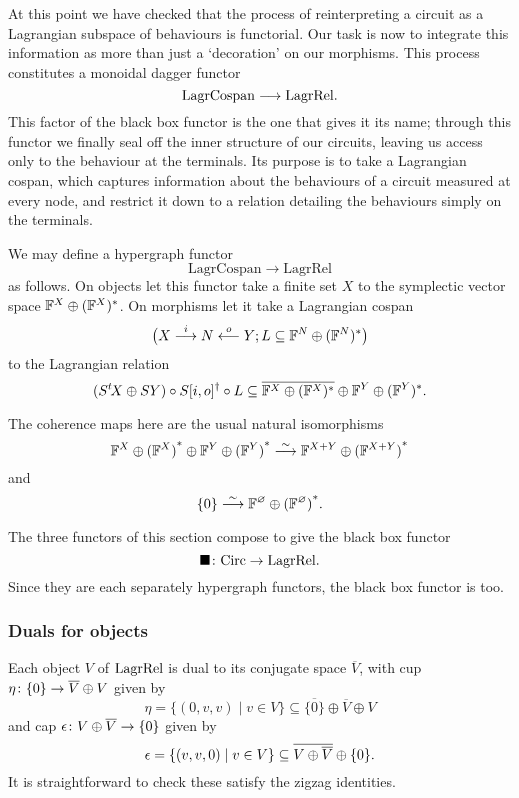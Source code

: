 At this point we have checked that the process of reinterpreting a circuit as a
Lagrangian subspace of behaviours is functorial. Our task is now to integrate
this information as more than just a `decoration' on our morphisms. This process
constitutes a monoidal dagger functor
\[
  \mathrm{LagrCospan} \longrightarrow \mathrm{LagrRel}.
\]
This factor of the black box functor is the one that gives it its name;
through this functor we finally seal off the inner structure of our circuits,
leaving us access only to the behaviour at the terminals. Its purpose is to take a 
Lagrangian cospan, which captures information about the behaviours of a 
circuit measured at every node, and restrict it down to a 
relation detailing the behaviours simply on the terminals. 

\begin{proposition}
We may define a hypergraph functor
\[
  \mathrm{LagrCospan} \longrightarrow \mathrm{LagrRel}
\]
as follows. On objects let this functor take a finite set $X$ to the symplectic
vector space ${\mathbb F}^X \oplus ({\mathbb F}^X)^\ast$. On morphisms let it take a Lagrangian
cospan
\[
  \big(X\stackrel{i}{\longrightarrow} N \stackrel{o}{\longleftarrow} Y; L
  \subseteq {\mathbb F}^N \oplus ({\mathbb F}^N)^\ast\big)
\]
to the Lagrangian relation
\[
  (S^t\!X\oplus SY) \circ S[i,o]^\dagger \circ L \subseteq
  \overline{{\mathbb F}^X \oplus ({\mathbb F}^X)^\ast} \oplus {\mathbb F}^Y \oplus ({\mathbb F}^Y)^\ast.  
\]  
\end{proposition}

The coherence maps here are the usual natural isomorphisms
\[
  {{\mathbb F}^{X} \oplus {({\mathbb F}^{X})}^\ast} \oplus {{\mathbb F}^{Y} \oplus {({\mathbb F}^{Y})}^\ast} \stackrel{\sim}{\longrightarrow} {{\mathbb F}^{X+Y} \oplus {({\mathbb F}^{X+Y})}^\ast} 
\]
and
\[
  \{0\} \stackrel{\sim}{\longrightarrow} {{\mathbb F}^{\varnothing} \oplus {({\mathbb F}^{\varnothing})}^\ast}.
\]

The three functors of this section compose to give the black box functor
\[
\blacksquare{\colon} \mathrm{Circ} \to \mathrm{LagrRel}.
\] 
Since they are each separately hypergraph functors, the black box
functor is too.


\subsubsection*{Duals for objects}

Each object $V$ of $\mathrm{LagrRel}$ is dual to its conjugate space $\overline
V$, with cup $\eta{\colon} \{0\} \to \overline{V} \oplus V$ given by 
\[
  \eta = \{(0,v,v) \mid v \in V\} \subseteq \overline{\{0\}} \oplus \overline{V}
  \oplus V
\]
and cap $\epsilon{\colon} V \oplus \overline{V} \to \{0\}$ given by
\[
  \epsilon = \{(v,v,0) \mid v \in V\} \subseteq \overline{V \oplus \overline{V}}
  \oplus \{0\}.
\]
It is straightforward to check these satisfy the zigzag identities.

